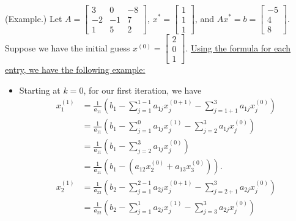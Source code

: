 \documentclass[letterpaper]{article}
\newcommand{\0}{\mathbf{0}}
\begin{document}
\begin{mdframed}
    (Example.) Let $A = \begin{bmatrix}
        3 & 0 & -8 \\ 
        -2 & -1 & 7 \\ 
        1 & 5 & 2
    \end{bmatrix}$, $x^* = \begin{bmatrix}
        1 \\ 1 \\ 1
    \end{bmatrix}$, and $Ax^* = b = \begin{bmatrix}
        -5 \\ 4 \\ 8
    \end{bmatrix}$. Suppose we have the initial guess $x^{(0)} = \begin{bmatrix}
        2 \\ 0 \\ 1
    \end{bmatrix}$. \underline{Using the formula for each entry, we have the following example:}
    \begin{itemize}
        \item Starting at $k = 0$, for our first iteration, we have 
        \begin{equation*}
            \begin{aligned}
                x_{1}^{(1)} &= \frac{1}{a_{11}} \left(b_{1} - \sum_{j = 1}^{1 - 1} a_{1j} x_{j}^{(0 + 1)} - \sum_{j = 1 + 1}^{3} a_{1j}x_{j}^{(0)}\right) \\
                    &= \frac{1}{a_{11}} \left(b_{1} - \sum_{j = 1}^{0} a_{1j} x_{j}^{(1)} - \sum_{j = 2}^{3} a_{1j}x_{j}^{(0)}\right) \\
                    &= \frac{1}{a_{11}} \left(b_{1} - \sum_{j = 2}^{3} a_{1j}x_{j}^{(0)}\right) \\ 
                    &= \frac{1}{a_{11}} \left(b_{1} - (a_{12}x_{2}^{(0)} + a_{13}x_{3}^{(0)})\right).
            \end{aligned}
        \end{equation*}
        \begin{equation*}
            \begin{aligned}
                x_{2}^{(1)} &= \frac{1}{a_{22}} \left(b_{2} - \sum_{j = 1}^{2 - 1} a_{2j} x_{j}^{(0 + 1)} - \sum_{j = 2 + 1}^{3} a_{2j}x_{j}^{(0)}\right) \\ 
                    &= \frac{1}{a_{22}} \left(b_{2} - \sum_{j = 1}^{1} a_{2j} x_{j}^{(1)} - \sum_{j = 3}^{3} a_{2j}x_{j}^{(0)}\right) \\ 

\end{aligned}
\end{equation*}
\end{itemize}
\end{mdframed}
\end{document}
